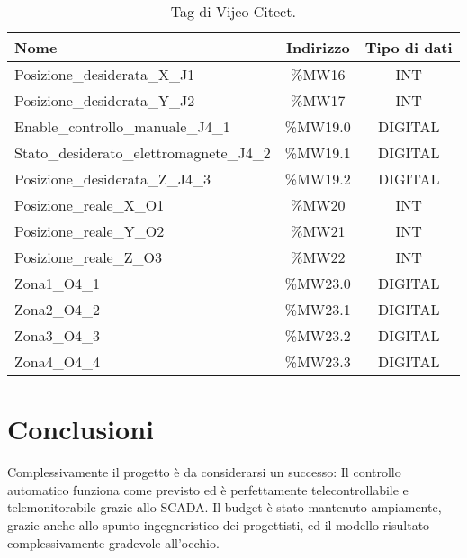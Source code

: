 \begin{table*}[htbp]\centering
    \caption{Tag di Vijeo Citect.}\label{tab:tags}
    \begin{tabular}{@{}lcc@{}}\toprule
        \textbf{Nome}                               & \textbf{Indirizzo} & \textbf{Tipo di dati} \\ \midrule
        Posizione\_desiderata\_X\_J1            & \%MW16       & INT                   \\
        Posizione\_desiderata\_Y\_J2            & \%MW17       & INT                   \\
        Enable\_controllo\_manuale\_J4\_1        & \%MW19.0     & DIGITAL               \\
        Stato\_desiderato\_elettromagnete\_J4\_2 & \%MW19.1     & DIGITAL               \\
        Posizione\_desiderata\_Z\_J4\_3          & \%MW19.2     & DIGITAL               \\
        Posizione\_reale\_X\_O1                 & \%MW20       & INT                   \\
        Posizione\_reale\_Y\_O2                 & \%MW21       & INT                   \\
        Posizione\_reale\_Z\_O3                 & \%MW22       & INT                   \\
        Zona1\_O4\_1                           & \%MW23.0     & DIGITAL               \\
        Zona2\_O4\_2                           & \%MW23.1     & DIGITAL               \\
        Zona3\_O4\_3                           & \%MW23.2     & DIGITAL               \\
        Zona4\_O4\_4                           & \%MW23.3     & DIGITAL               \\
    \bottomrule\end{tabular}
\end{table*}

\section{Conclusioni}

Complessivamente il progetto è da considerarsi un successo: Il controllo automatico funziona come
previsto ed è perfettamente telecontrollabile e telemonitorabile grazie allo SCADA. Il budget è
stato mantenuto ampiamente, grazie anche allo spunto ingegneristico dei progettisti, ed il modello
risultato complessivamente gradevole all'occhio.

